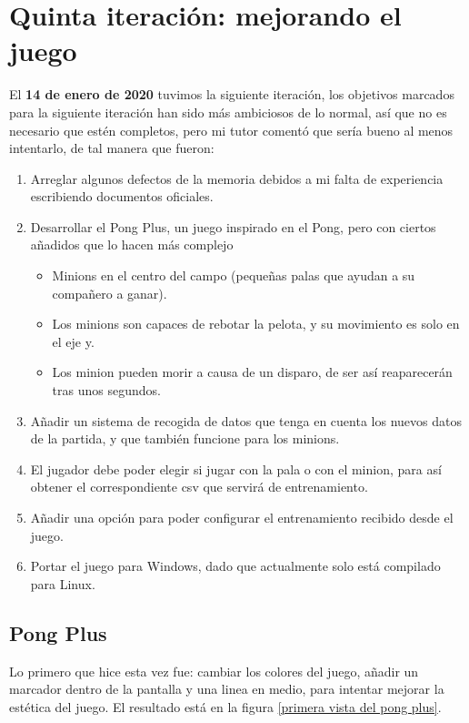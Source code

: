 \section{Quinta iteración: mejorando el juego}
El \textbf{14 de enero de 2020} tuvimos la siguiente iteración, los objetivos marcados para la siguiente iteración han sido más ambiciosos de lo normal, así que no es necesario que estén completos, pero mi tutor comentó que sería bueno al menos intentarlo, de tal manera que fueron:
\begin{enumerate}
	\item Arreglar algunos defectos de la memoria debidos a mi falta de experiencia escribiendo documentos oficiales.
	\item Desarrollar el Pong Plus, un juego inspirado en el Pong, pero con ciertos añadidos que lo hacen más complejo
	\begin{itemize}
		\item Minions en el centro del campo (pequeñas palas que ayudan a su compañero a ganar).
		\item Los minions son capaces de rebotar la pelota, y su movimiento es solo en el eje y.
		\item Los minion pueden morir a causa de un disparo, de ser así reaparecerán tras unos segundos.
	\end{itemize}
	\item Añadir un sistema de recogida de datos que tenga en cuenta los nuevos datos de la partida, y que también funcione para los minions.
	\item El jugador debe poder elegir si jugar con la pala o con el minion, para así obtener el correspondiente \gls{csv} que servirá de entrenamiento.
	\item Añadir una opción para poder configurar el entrenamiento recibido desde el juego.
	\item Portar el juego para Windows, dado que actualmente solo está compilado para Linux.
\end{enumerate}

\subsection{Pong Plus}
Lo primero que hice esta vez fue: cambiar los colores del juego, añadir un marcador dentro de la pantalla y una linea en medio, para intentar mejorar la estética del juego. El resultado está en la figura \ref{primera vista del pong plus}.

